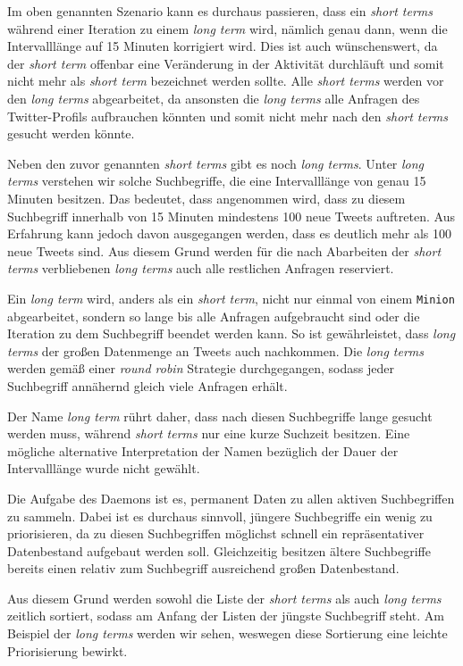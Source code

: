Im oben genannten Szenario kann es durchaus passieren, dass ein \textit{short terms} während einer Iteration zu einem \textit{long term} wird, nämlich genau dann, wenn die Intervalllänge auf 15 Minuten korrigiert wird. Dies ist auch wünschenswert, da der \textit{short term} offenbar eine Veränderung in der Aktivität durchläuft und somit nicht mehr als \textit{short term} bezeichnet werden sollte.
Alle \textit{short terms} werden vor den \textit{long terms} abgearbeitet, da ansonsten die \textit{long terms} alle Anfragen des Twitter-Profils aufbrauchen könnten und somit nicht mehr nach den \textit{short terms} gesucht werden könnte. 

Neben den zuvor genannten \textit{short terms} gibt es noch \textit{long terms}.
Unter \textit{long terms} verstehen wir solche Suchbegriffe, die eine Intervalllänge von genau 15 Minuten besitzen.
Das bedeutet, dass angenommen wird, dass zu diesem Suchbegriff innerhalb von 15 Minuten mindestens 100 neue Tweets auftreten.
Aus Erfahrung kann jedoch davon ausgegangen werden, dass es deutlich mehr als 100 neue Tweets sind.
Aus diesem Grund werden für die nach Abarbeiten der \textit{short terms} verbliebenen \textit{long terms} auch alle restlichen Anfragen reserviert.

Ein \textit{long term} wird, anders als ein \textit{short term}, nicht nur einmal von einem \texttt{Minion} abgearbeitet, sondern so lange bis alle Anfragen aufgebraucht sind oder die Iteration zu dem Suchbegriff beendet werden kann. So ist gewährleistet, dass \textit{long terms} der großen Datenmenge an Tweets auch nachkommen. Die \textit{long terms} werden gemäß einer \textit{round robin} Strategie durchgegangen, sodass jeder Suchbegriff annähernd gleich viele Anfragen erhält.

Der Name \textit{long term} rührt daher, dass nach diesen Suchbegriffe lange gesucht werden muss, während \textit{short terms} nur eine kurze Suchzeit besitzen. Eine mögliche alternative Interpretation der Namen bezüglich der Dauer der Intervalllänge wurde nicht gewählt.

Die Aufgabe des Daemons ist es, permanent Daten zu allen aktiven Suchbegriffen zu sammeln.
Dabei ist es durchaus sinnvoll, jüngere Suchbegriffe ein wenig zu priorisieren, da zu diesen Suchbegriffen möglichst schnell ein repräsentativer Datenbestand aufgebaut werden soll.
Gleichzeitig besitzen ältere Suchbegriffe bereits einen relativ zum Suchbegriff ausreichend großen Datenbestand.

Aus diesem Grund werden sowohl die Liste der \textit{short terms} als auch \textit{long terms} zeitlich sortiert, sodass am Anfang der Listen der jüngste Suchbegriff steht. Am Beispiel der \textit{long terms} werden wir sehen, weswegen diese Sortierung eine leichte Priorisierung bewirkt.

